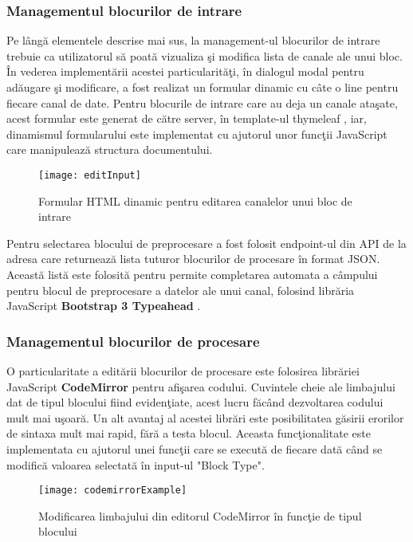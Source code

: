 \subsubsection{Managementul blocurilor de intrare}
Pe lângă elementele descrise mai sus, la management-ul blocurilor de intrare trebuie ca utilizatorul să poată vizualiza şi modifica lista de canale ale unui bloc. În vederea implementării acestei particularităţi, în dialogul modal pentru adăugare şi modificare, a fost realizat un formular dinamic cu câte o line pentru fiecare canal de date. Pentru blocurile de intrare care au deja un canale ataşate, acest formular este generat de către server, în template-ul thymeleaf , iar, dinamismul formularului este implementat cu ajutorul unor funcţii JavaScript care manipulează structura documentului.
\begin{figure}[H]
	\centering
	\texttt{[image: editInput]}
	\caption{Formular HTML dinamic pentru editarea canalelor unui bloc de intrare }
	\label{fig:editInput}
\end{figure}
Pentru selectarea blocului de preprocesare a fost folosit endpoint-ul din API de la adresa  care returnează lista tuturor blocurilor de procesare în format JSON. Această listă este folosită pentru permite completarea automata a câmpului pentru blocul de preprocesare a datelor ale unui canal, folosind librăria JavaScript \textbf{Bootstrap 3 Typeahead} \autocite{typeahead}.

\subsubsection{Managementul blocurilor de procesare}
O particularitate a editării blocurilor de procesare este folosirea librăriei JavaScript \textbf{CodeMirror} \autocite{codemirror} pentru afişarea codului. Cuvintele cheie ale limbajului dat de tipul blocului fiind evidenţiate, acest lucru făcând dezvoltarea codului mult mai uşoară. Un alt avantaj al acestei librări este posibilitatea găsirii erorilor de sintaxa mult mai rapid, fără a testa blocul. Aceasta funcţionalitate este implementata cu ajutorul unei funcţii care se execută de fiecare dată când se modifică valoarea selectată în input-ul "Block Type".
\begin{figure}[H]
	\centering
	\texttt{[image: codemirrorExample]}
	\caption{Modificarea limbajului din editorul CodeMirror în funcţie de tipul blocului}
	\label{fig:codemirrorExample}
\end{figure}
